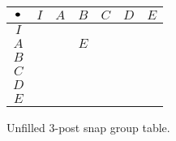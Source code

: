 \documentclass[../gatm.tex]{subfiles}
\begin{document}
\begin{figure}
\begin{center}
\begin{tabular}{C|C|C|C|C|C|C|}
$\bullet$ & $I$ & $A$ & $B$ & $C$ & $D$ & $E$ \\ \hline
$I$    &   &   &   &   &   &   \\ \hline
$A$    &   &   & $E$ &   &   &   \\ \hline
$B$    &   &   &   &   &   &   \\ \hline
$C$    &   &   &   &   &   &   \\ \hline
$D$    &   &   &   &   &   &   \\ \hline
$E$    &   &   &   &   &   &   \\ \hline
\end{tabular}
\end{center}
\caption{Unfilled $3$-post snap group table.}
\label{sbstable}
\end{figure}
\end{document}

